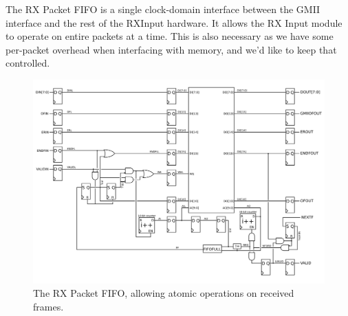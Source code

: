 The RX Packet FIFO is a single clock-domain interface between the GMII
interface and the rest of the RXInput hardware. It allows the RX Input
module to operate on entire packets at a time. This is also necessary
as we have some per-packet overhead when interfacing with memory, and
we'd like to keep that controlled. 

\begin{figure}
\label{rxpktfifo}
\includegraphics[scale=0.7]{rxpktfifo.svg}
\caption{The RX Packet FIFO, allowing atomic operations on received frames.}
\end{figure}
